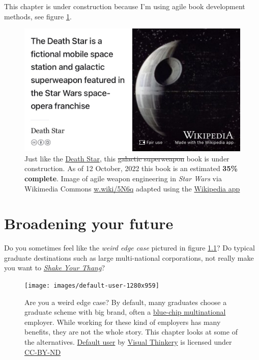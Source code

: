 \documentclass[
]{book}
\begin{document}
This chapter is under construction because I'm using agile book development methods, see figure \ref{fig:deathstar5-fig}.

\begin{figure}

{\centering \includegraphics[width=0.99\linewidth]{images/DeathStar2} 

}

\caption{Just like the \href{https://en.wikipedia.org/wiki/Death_Star}{Death Star}, this \sout{galactic superweapon} book is under construction. As of 12 October, 2022 this book is an estimated \textbf{35\% complete}. Image of agile weapon engineering in \emph{Star Wars} via Wikimedia Commons \href{https://w.wiki/5N6q}{w.wiki/5N6q} adapted using the \href{https://apps.apple.com/gb/app/wikipedia/id324715238}{Wikipedia app}}\label{fig:deathstar5-fig}
\end{figure}

\hypertarget{broadening}{%
\chapter{Broadening your future}\label{broadening}}

Do you sometimes feel like the \emph{weird edge case} pictured in figure \ref{fig:default-user-fig}? Do typical graduate destinations such as large multi-national corporations, not really make you want to \emph{\href{https://en.wikipedia.org/wiki/Shake_Your_Thang}{Shake Your Thang}}? \citep{saltnpepa}

\begin{figure}

{\centering \texttt{[image: images/default-user-1280x959]} 

}

\caption{Are you a weird edge case? By default, many graduates choose a graduate scheme with big brand, often a \href{https://en.wikipedia.org/wiki/Blue_chip_(stock_market)}{blue-chip multinational} employer. While working for these kind of employers has many benefits, they are not the whole story. This chapter looks at some of the alternatives. \href{https://bryanmmathers.com/default-user/}{Default user} by \href{https://visualthinkery.com}{Visual Thinkery} is licensed under \href{https://creativecommons.org/licenses/by-nd/4.0/}{CC-BY-ND}}\label{fig:default-user-fig}
\end{figure}
\end{document}
